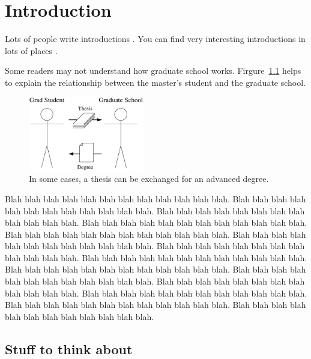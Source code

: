 \chapter{Introduction}

Lots of people write introductions \cite{whole-set}.  You can find 
very interesting introductions in lots of places 
\cite{booklet-full,inproceedings-full,article-full}.

Some readers may not understand how graduate school works.  
Firgure~\ref{how.to.graduate.fig} helps to explain the relationship between
the master's student and the graduate school.

\begin{figure}
\centerline{\includegraphics[height=0.34\textwidth,width=0.45\textwidth]{graduation.eps}}

\caption{In some cases, a thesis can be exchanged for an advanced degree.}

\label{how.to.graduate.fig}
\end{figure}

Blah blah blah blah blah blah blah blah blah blah blah blah.
Blah blah blah blah blah blah blah blah blah blah blah blah.
Blah blah blah blah blah blah blah blah blah blah blah blah.
Blah blah blah blah blah blah blah blah blah blah blah blah.
Blah blah blah blah blah blah blah blah blah blah blah blah.
Blah blah blah blah blah blah blah blah blah blah blah blah.
Blah blah blah blah blah blah blah blah blah blah blah blah.
Blah blah blah blah blah blah blah blah blah blah blah blah.
Blah blah blah blah blah blah blah blah blah blah blah blah.
Blah blah blah blah blah blah blah blah blah blah blah blah.
Blah blah blah blah blah blah blah blah blah blah blah blah.
Blah blah blah blah blah blah blah blah blah blah blah blah.
Blah blah blah blah blah blah blah blah blah blah blah blah.
Blah blah blah blah blah blah blah blah blah blah blah blah.

\section{Stuff to think about}

